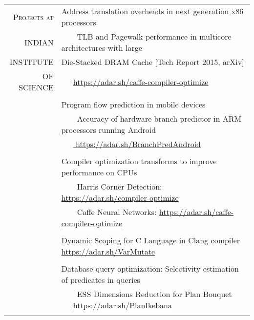 \documentclass[a4paper,10pt]{article} %
\newcommand{\tabitem}{~~\llap{\textbullet}~~}
\begin{document}
\begin{tabular}{rp{12cm}}
	\textsc{Projects at} &  Address translation overheads in next generation x86 processors\\
	\textsc{INDIAN} &  \tabitem TLB and Pagewalk performance in multicore architectures with large\\
	\textsc{INSTITUTE} &   Die-Stacked DRAM Cache \hfill [Tech Report 2015, arXiv] \\
	\textsc{OF SCIENCE} & ~~~\href{https://adar.sh/caffe-compiler-optimize}{https://adar.sh/caffe-compiler-optimize}\\
	& \\
	& Program flow prediction in mobile devices \\
	& \tabitem Accuracy of hardware branch predictor in ARM processors running Android \\
	& ~~~\href{https://adar.sh/BranchPredAndroid}{ https://adar.sh/BranchPredAndroid} \\
	& \\
	& Compiler optimization transforms to improve performance on CPUs\\
	& \tabitem Harris Corner Detection: \href{https://adar.sh/compiler-optimize}{https://adar.sh/compiler-optimize}\\
	& \tabitem Caffe Neural Networks:  \href{https://adar.sh/caffe-compiler-optimize}{https://adar.sh/caffe-compiler-optimize}\\
	& \\
	& Dynamic Scoping for C Language in Clang compiler \href{https://adar.sh/VarMutate}{https://adar.sh/VarMutate} \\
	& \\
	& Database query optimization: Selectivity estimation of predicates in queries \\
	& \tabitem ESS Dimensions Reduction for Plan Bouquet ~~~\href{https://adar.sh/PlanIkebana}{https://adar.sh/PlanIkebana}\\
	&\\
\end{tabular}
\end{document}
